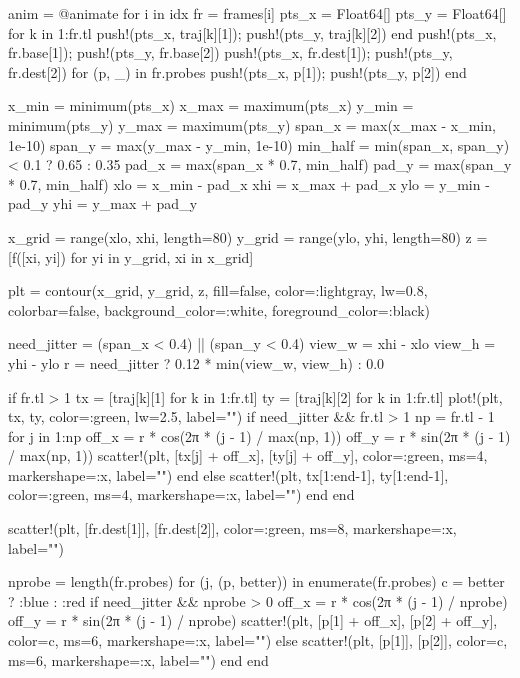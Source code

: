 \documentclass[a4paper, 14pt]{extarticle}
\begin{document}
\begin{breakablelisting}
    anim = @animate for i in idx
        fr = frames[i]
        pts_x = Float64[]
        pts_y = Float64[]
        for k in 1:fr.tl
            push!(pts_x, traj[k][1]); push!(pts_y, traj[k][2])
        end
        push!(pts_x, fr.base[1]); push!(pts_y, fr.base[2])
        push!(pts_x, fr.dest[1]); push!(pts_y, fr.dest[2])
        for (p, _) in fr.probes
            push!(pts_x, p[1]); push!(pts_y, p[2])
        end

        x_min = minimum(pts_x)
        x_max = maximum(pts_x)
        y_min = minimum(pts_y)
        y_max = maximum(pts_y)
        span_x = max(x_max - x_min, 1e-10)
        span_y = max(y_max - y_min, 1e-10)
        min_half = min(span_x, span_y) < 0.1 ? 0.65 : 0.35
        pad_x = max(span_x * 0.7, min_half)
        pad_y = max(span_y * 0.7, min_half)
        xlo = x_min - pad_x
        xhi = x_max + pad_x
        ylo = y_min - pad_y
        yhi = y_max + pad_y

        x_grid = range(xlo, xhi, length=80)
        y_grid = range(ylo, yhi, length=80)
        z = [f([xi, yi]) for yi in y_grid, xi in x_grid]

        plt = contour(x_grid, y_grid, z, fill=false, color=:lightgray, lw=0.8,
                     colorbar=false, background_color=:white, foreground_color=:black)

        need_jitter = (span_x < 0.4) || (span_y < 0.4)
        view_w = xhi - xlo
        view_h = yhi - ylo
        r = need_jitter ? 0.12 * min(view_w, view_h) : 0.0

        if fr.tl > 1
            tx = [traj[k][1] for k in 1:fr.tl]
            ty = [traj[k][2] for k in 1:fr.tl]
            plot!(plt, tx, ty, color=:green, lw=2.5, label="")
            if need_jitter && fr.tl > 1
                np = fr.tl - 1
                for j in 1:np
                    off_x = r * cos(2π * (j - 1) / max(np, 1))
                    off_y = r * sin(2π * (j - 1) / max(np, 1))
                    scatter!(plt, [tx[j] + off_x], [ty[j] + off_y], color=:green, ms=4, markershape=:x, label="")
                end
            else
                scatter!(plt, tx[1:end-1], ty[1:end-1], color=:green, ms=4, markershape=:x, label="")
            end
        end

        scatter!(plt, [fr.dest[1]], [fr.dest[2]],
                 color=:green, ms=8, markershape=:x, label="")

        nprobe = length(fr.probes)
        for (j, (p, better)) in enumerate(fr.probes)
            c = better ? :blue : :red
            if need_jitter && nprobe > 0
                off_x = r * cos(2π * (j - 1) / nprobe)
                off_y = r * sin(2π * (j - 1) / nprobe)
                scatter!(plt, [p[1] + off_x], [p[2] + off_y], color=c, ms=6, markershape=:x, label="")
            else
                scatter!(plt, [p[1]], [p[2]], color=c, ms=6, markershape=:x, label="")
            end
        end


\end{breakablelisting}
\end{document}
